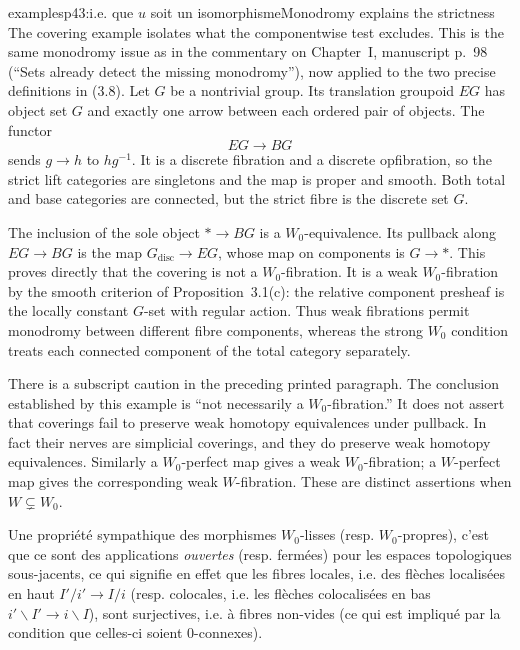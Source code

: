 \begin{dcomment}{examples}{p43:i.e. que $u$ soit un isomorphisme}{Monodromy explains the strictness}
The covering example isolates what the componentwise test excludes. This is the same monodromy issue as in the commentary on Chapter~I, manuscript p.~98 (``Sets already detect the missing monodromy''), now applied to the two precise definitions in (3.8). Let $G$ be a nontrivial group. Its translation groupoid $E G$ has object set $G$ and exactly one arrow between each ordered pair of objects. The functor
\[
 E G\longrightarrow B G
\]
sends $g\longrightarrow h$ to $hg^{-1}$. It is a discrete fibration and a discrete opfibration, so the strict lift categories are singletons and the map is proper and smooth. Both total and base categories are connected, but the strict fibre is the discrete set $G$.

The inclusion of the sole object $*\longrightarrow BG$ is a $W_0$-equivalence. Its pullback along $EG\longrightarrow BG$ is the map $G_{\mathrm{disc}}\longrightarrow EG$, whose map on components is $G\longrightarrow *$. This proves directly that the covering is not a $W_0$-fibration. It is a weak $W_0$-fibration by the smooth criterion of Proposition~3.1(c): the relative component presheaf is the locally constant $G$-set with regular action. Thus weak fibrations permit monodromy between different fibre components, whereas the strong $W_0$ condition treats each connected component of the total category separately.

There is a subscript caution in the preceding printed paragraph. The conclusion established by this example is ``not necessarily a $W_0$-fibration.'' It does not assert that coverings fail to preserve weak homotopy equivalences under pullback. In fact their nerves are simplicial coverings, and they do preserve weak homotopy equivalences. Similarly a $W_0$-perfect map gives a weak $W_0$-fibration; a $W$-perfect map gives the corresponding weak $W$-fibration. These are distinct assertions when $W\subsetneq W_0$.
\end{dcomment}


Une propriété sympathique des morphismes $W_0$-lisses (resp. $W_0$-propres), c'est que ce sont des applications \textit{ouvertes} (resp. fermées) pour les espaces topologiques sous-jacents, ce qui signifie en effet que les fibres locales, i.e. des flèches localisées en haut $I'/i' \longrightarrow I/i$ (resp. colocales, i.e. les flèches colocalisées en bas $i'\backslash I' \longrightarrow i\backslash I$), sont surjectives, i.e. à fibres non-vides (ce qui est impliqué par la condition que celles-ci soient 0-connexes).

